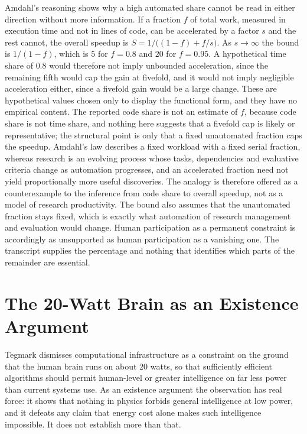 \documentclass[11pt]{article}
\begin{document}
Amdahl's reasoning \cite{Amdahl1967} shows why a high automated share cannot be read in either direction without more information. If a fraction $f$ of total work, measured in execution time and not in lines of code, can be accelerated by a factor $s$ and the rest cannot, the overall speedup is $S=1/\bigl((1-f)+f/s\bigr)$. As $s\to\infty$ the bound is $1/(1-f)$, which is $5$ for $f=0.8$ and $20$ for $f=0.95$. A hypothetical time share of $0.8$ would therefore not imply unbounded acceleration, since the remaining fifth would cap the gain at fivefold, and it would not imply negligible acceleration either, since a fivefold gain would be a large change. These are hypothetical values chosen only to display the functional form, and they have no empirical content. The reported code share is not an estimate of $f$, because code share is not time share, and nothing here suggests that a fivefold cap is likely or representative; the structural point is only that a fixed unautomated fraction caps the speedup. Amdahl's law describes a fixed workload with a fixed serial fraction, whereas research is an evolving process whose tasks, dependencies and evaluative criteria change as automation progresses, and an accelerated fraction need not yield proportionally more useful discoveries. The analogy is therefore offered as a counterexample to the inference from code share to overall speedup, not as a model of research productivity. The bound also assumes that the unautomated fraction stays fixed, which is exactly what automation of research management and evaluation would change. Human participation as a permanent constraint is accordingly as unsupported as human participation as a vanishing one. The transcript supplies the percentage and nothing that identifies which parts of the remainder are essential.

\section{The 20-Watt Brain as an Existence Argument}

Tegmark dismisses computational infrastructure as a constraint on the ground that the human brain runs on about 20 watts, so that sufficiently efficient algorithms should permit human-level or greater intelligence on far less power than current systems use. As an existence argument the observation has real force: it shows that nothing in physics forbids general intelligence at low power, and it defeats any claim that energy cost alone makes such intelligence impossible. It does not establish more than that.
\end{document}

